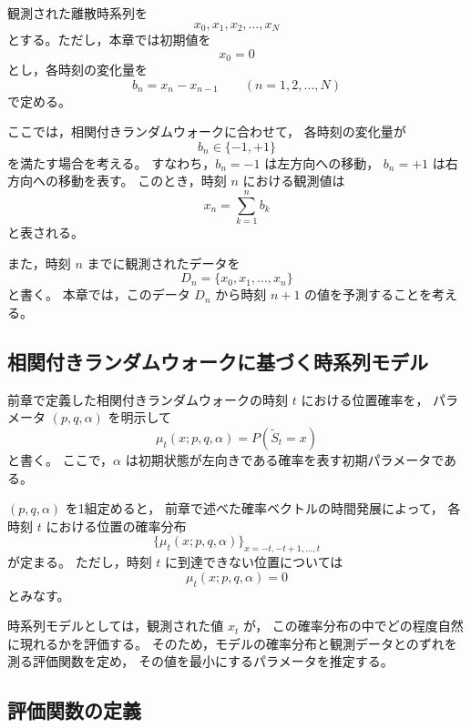 \documentclass[a4j,dvipdfmx]{jsarticle}
\theoremstyle{plainnote}
\begin{document}
観測された離散時系列を
\[
  x_0,x_1,x_2,\ldots,x_N
\]
とする。ただし，本章では初期値を
\begin{equation}
  x_0=0
  \label{eq:model_x0}
\end{equation}
とし，各時刻の変化量を
\begin{equation}
  b_n=x_n-x_{n-1}
  \qquad (n=1,2,\ldots,N)
  \label{eq:model_bn}
\end{equation}
で定める。

ここでは，相関付きランダムウォークに合わせて，
各時刻の変化量が
\begin{equation}
  b_n\in\{-1,+1\}
  \label{eq:model_bn_pm}
\end{equation}
を満たす場合を考える。
すなわち，$b_n=-1$ は左方向への移動，
$b_n=+1$ は右方向への移動を表す。
このとき，時刻 $n$ における観測値は
\begin{equation}
  x_n=\sum_{k=1}^{n} b_k
  \label{eq:model_xn}
\end{equation}
と表される。

また，時刻 $n$ までに観測されたデータを
\begin{equation}
  D_n=\{x_0,x_1,\ldots,x_n\}
  \label{eq:model_Dn}
\end{equation}
と書く。
本章では，このデータ $D_n$ から時刻 $n+1$ の値を予測することを考える。

\subsection{相関付きランダムウォークに基づく時系列モデル}

前章で定義した相関付きランダムウォークの時刻 $t$ における位置確率を，
パラメータ $(p,q,\alpha)$ を明示して
\begin{equation}
  \mu_t(x;p,q,\alpha)
  =
  P(\tilde{S}_t=x)
  \label{eq:model_mu}
\end{equation}
と書く。
ここで，$\alpha$ は初期状態が左向きである確率を表す初期パラメータである。

$(p,q,\alpha)$ を1組定めると，
前章で述べた確率ベクトルの時間発展によって，
各時刻 $t$ における位置の確率分布
\[
  \{\mu_t(x;p,q,\alpha)\}_{x=-t,-t+1,\ldots,t}
\]
が定まる。
ただし，時刻 $t$ に到達できない位置については
\[
  \mu_t(x;p,q,\alpha)=0
\]
とみなす。

時系列モデルとしては，観測された値 $x_t$ が，
この確率分布の中でどの程度自然に現れるかを評価する。
そのため，モデルの確率分布と観測データとのずれを測る評価関数を定め，
その値を最小にするパラメータを推定する。

\subsection{評価関数の定義}
\end{document}
